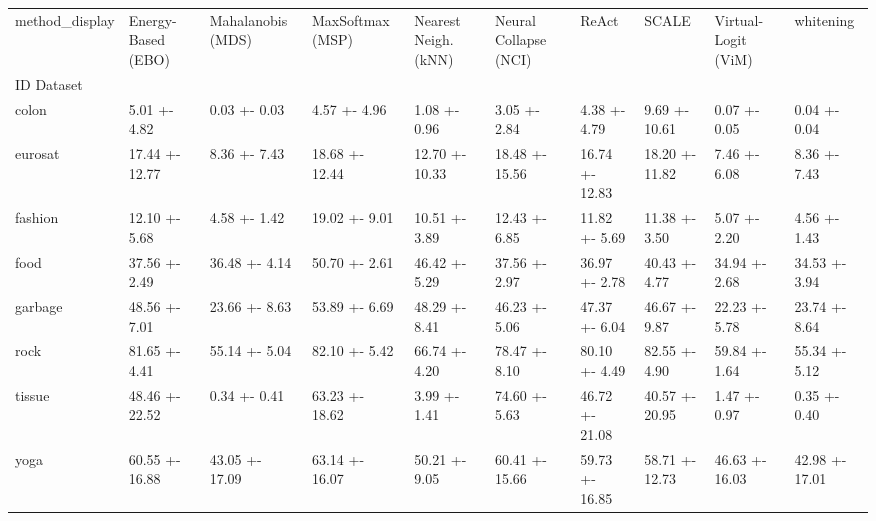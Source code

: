 \begin{tabular}{llllllllll}
\toprule
method_display & Energy-Based (EBO) & Mahalanobis (MDS) & MaxSoftmax (MSP) & Nearest Neigh. (kNN) & Neural Collapse (NCI) & ReAct & SCALE & Virtual-Logit (ViM) & whitening \\
ID Dataset &  &  &  &  &  &  &  &  &  \\
\midrule
colon & 5.01 +- 4.82 & 0.03 +- 0.03 & 4.57 +- 4.96 & 1.08 +- 0.96 & 3.05 +- 2.84 & 4.38 +- 4.79 & 9.69 +- 10.61 & 0.07 +- 0.05 & 0.04 +- 0.04 \\
eurosat & 17.44 +- 12.77 & 8.36 +- 7.43 & 18.68 +- 12.44 & 12.70 +- 10.33 & 18.48 +- 15.56 & 16.74 +- 12.83 & 18.20 +- 11.82 & 7.46 +- 6.08 & 8.36 +- 7.43 \\
fashion & 12.10 +- 5.68 & 4.58 +- 1.42 & 19.02 +- 9.01 & 10.51 +- 3.89 & 12.43 +- 6.85 & 11.82 +- 5.69 & 11.38 +- 3.50 & 5.07 +- 2.20 & 4.56 +- 1.43 \\
food & 37.56 +- 2.49 & 36.48 +- 4.14 & 50.70 +- 2.61 & 46.42 +- 5.29 & 37.56 +- 2.97 & 36.97 +- 2.78 & 40.43 +- 4.77 & 34.94 +- 2.68 & 34.53 +- 3.94 \\
garbage & 48.56 +- 7.01 & 23.66 +- 8.63 & 53.89 +- 6.69 & 48.29 +- 8.41 & 46.23 +- 5.06 & 47.37 +- 6.04 & 46.67 +- 9.87 & 22.23 +- 5.78 & 23.74 +- 8.64 \\
rock & 81.65 +- 4.41 & 55.14 +- 5.04 & 82.10 +- 5.42 & 66.74 +- 4.20 & 78.47 +- 8.10 & 80.10 +- 4.49 & 82.55 +- 4.90 & 59.84 +- 1.64 & 55.34 +- 5.12 \\
tissue & 48.46 +- 22.52 & 0.34 +- 0.41 & 63.23 +- 18.62 & 3.99 +- 1.41 & 74.60 +- 5.63 & 46.72 +- 21.08 & 40.57 +- 20.95 & 1.47 +- 0.97 & 0.35 +- 0.40 \\
yoga & 60.55 +- 16.88 & 43.05 +- 17.09 & 63.14 +- 16.07 & 50.21 +- 9.05 & 60.41 +- 15.66 & 59.73 +- 16.85 & 58.71 +- 12.73 & 46.63 +- 16.03 & 42.98 +- 17.01 \\
\bottomrule
\end{tabular}
